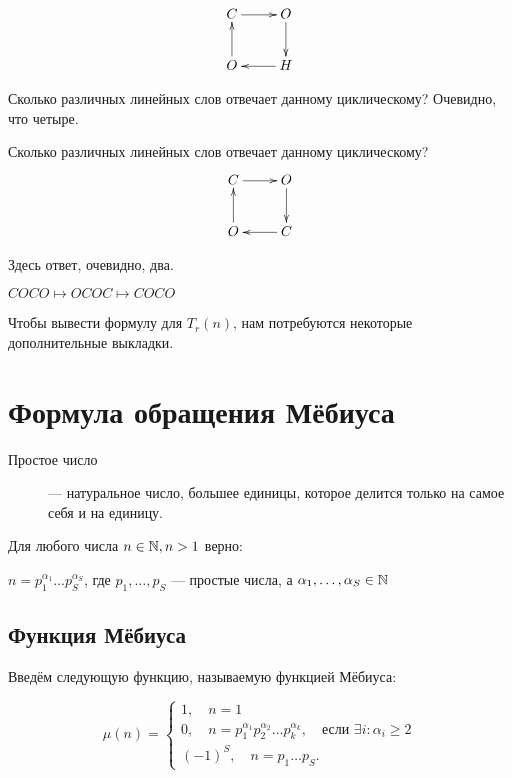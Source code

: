 \begin{cyclestask}
\begin{example}
\[
 \xymatrix{ C \ar[r] & O \ar[d] \\
               O \ar[u] & H \ar[l] }
\]

Сколько различных линейных слов отвечает данному циклическому? Очевидно, что четыре. 
\end{example}

\begin{example}
Сколько различных линейных слов отвечает данному циклическому?
\[
 \xymatrix{ C \ar[r] & O \ar[d] \\
               O \ar[u] & C \ar[l] }
\]

Здесь ответ, очевидно, два.

$COCO \mapsto  OCOC  \mapsto  COCO $
\end{example}

Чтобы вывести формулу для $T_r(n)$, нам потребуются некоторые дополнительные выкладки.

\end{cyclestask}

 
\section{Формула обращения Мёбиуса}

 \begin{description}
 \item[Простое число] --- натуральное число, большее единицы, которое делится только на самое себя и на единицу. 
 \end{description}
  
\begin{mainarithm}
Для любого числа $ n \in \mathbb{N}, n > 1$ верно: 

$ n = p_1 ^ {\alpha_1} \dots p_S ^ {\alpha_S} $, где $p_1,\dots, p_S$ --- простые числа, а $\alpha_1,\dots, \alpha_S \in \mathbb{N}$ 
\end{mainarithm}


\subsection{Функция Мёбиуса}
 
 Введём следующую функцию, называемую функцией Мёбиуса:
 
\[ 
\mu (n) = 
\begin{cases} 
	1, 
		\quad n = 1\\
	0, 
		\quad n = p_1^{\alpha_1} p_2^{\alpha_2} \dots p_k^{\alpha_k}, 		
		\quad \text{если } \exists i : \alpha_i \geq 2\\
	(-1)^S,
		 \quad n = p_1 \dots p_S .
\end{cases}
\]

